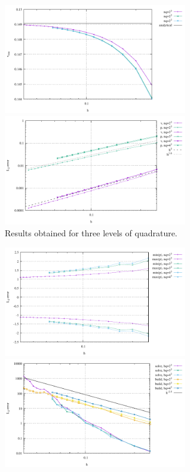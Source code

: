\begin{center}
\includegraphics[width=8cm]{python_codes/fieldstone_82/results/bench5/vrms.pdf}
\includegraphics[width=8cm]{python_codes/fieldstone_82/results/bench5/conv.pdf}\\
{\captionfont Results obtained for three levels of quadrature.}
\end{center}


\begin{center}
\includegraphics[width=8cm]{python_codes/fieldstone_82/results/bench5/p_stats.pdf}
\includegraphics[width=8cm]{python_codes/fieldstone_82/results/bench5/times.pdf}
\end{center}







